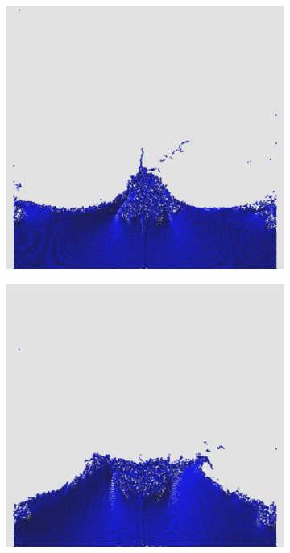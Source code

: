 \documentclass[12pt,a4paper,dvipsnames]{article}
\begin{document}
\begin{figure}[!h]
\begin{subfigure}[!h]{0.3\textwidth}
	\end{subfigure}
	\begin{subfigure}[!h]{0.3\textwidth} \centering
		\includegraphics[width=\textwidth]{WD/WD-09.jpg}
	\end{subfigure}
	\begin{subfigure}[!h]{0.3\textwidth} \centering
		\includegraphics[width=\textwidth]{WD/WD-10.jpg}

\end{subfigure}
\end{figure}
\end{document}
